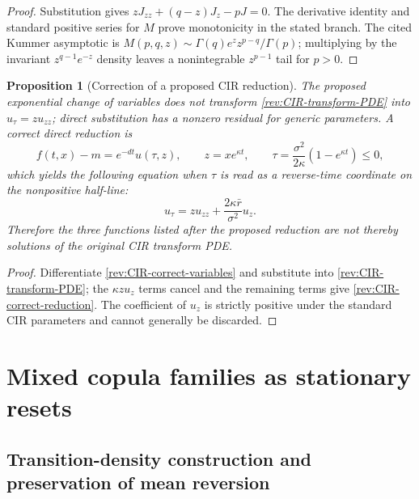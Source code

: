 \documentclass[11pt]{article}
\newtheorem{proposition}[definition]{Proposition}
\theoremstyle{remark}
\begin{document}
\begin{proof}
Substitution gives
$zJ_{zz}+(q-z)J_z-pJ=0$.  The derivative identity and standard positive series
for $M$ prove monotonicity in the stated branch.  The cited Kummer asymptotic is
$M(p,q,z)\sim\Gamma(q)e^zz^{p-q}/\Gamma(p)$; multiplying by the invariant
$z^{q-1}e^{-z}$ density leaves a nonintegrable $z^{p-1}$ tail for $p>0$.
\end{proof}

\begin{proposition}[Correction of a proposed CIR reduction]
\label{rev:prop-CIR-false-transform}
The proposed exponential change of variables does
not transform \eqref{rev:CIR-transform-PDE} into $u_\tau=zu_{zz}$; direct
substitution has a nonzero residual for generic parameters.  A correct direct
reduction is
\begin{equation}
f(t,x)-m=e^{-dt}u(\tau,z),\qquad
z=xe^{\kappa t},\qquad
\tau=\frac{\sigma^2}{2\kappa}(1-e^{\kappa t})\le0,
\label{rev:CIR-correct-variables}
\end{equation}
which yields the following equation when $\tau$ is read as a reverse-time
coordinate on the nonpositive half-line:
\begin{equation}
u_\tau=zu_{zz}+\frac{2\kappa\bar r}{\sigma^2}u_z.
\label{rev:CIR-correct-reduction}
\end{equation}
Therefore the three functions listed after the proposed reduction are not thereby
solutions of the original CIR transform PDE.
\end{proposition}

\begin{proof}
Differentiate \eqref{rev:CIR-correct-variables} and substitute into
\eqref{rev:CIR-transform-PDE}; the $\kappa z u_z$ terms cancel and the remaining
terms give \eqref{rev:CIR-correct-reduction}.  The coefficient of $u_z$ is
strictly positive under the standard CIR parameters and cannot generally be
discarded.
\end{proof}

\section{Mixed copula families as stationary resets}

\subsection{Transition-density construction and preservation of mean reversion}
\end{document}
